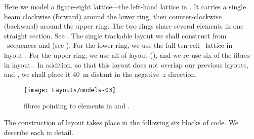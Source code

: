 %
Here we model a figure-eight lattice---the left-hand lattice in
. It carries a single beam clockwise (forward)
around the lower ring, then counter-clockwise (backward) around
the upper ring. The two rings share several elements in one
straight section. See . The single trackable
layout  we shall construct from \DNA\ sequences 
and  (see ). For the lower ring, we use
the full ten-cell \PSR\ lattice in layout . For the upper
ring, we use all of layout  (), and we
re-use six of the fibres in layout . In addition, so that
this layout does not overlap our previous layouts,  and
, we shall place it \SI{40}{m} distant in the negative~$z$
direction.

\begin{figure}[ht]
  \centering
  \texttt{[image: Layouts/models-03]}
  \caption{ fibres pointing to elements in 
           and .}
  \label{fig:accel.fig8}
\end{figure}

The construction of layout  takes place in the following
six blocks of code. We describe each in detail.

